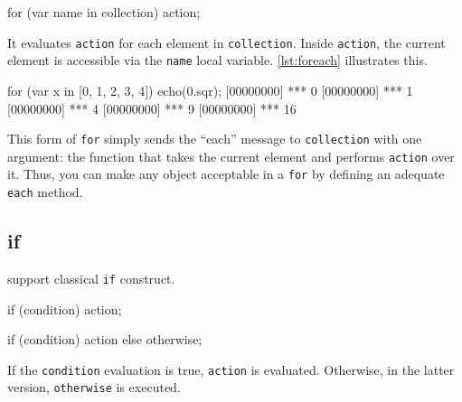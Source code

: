 \begin{urbiscript}[frame=, backgroundcolor=, ]
  for (var name in collection)
    action;
\end{urbiscript}

It evaluates \lstinline|action| for each element in
\lstinline|collection|. Inside \lstinline|action|, the current element
is accessible via the \lstinline|name| local variable. \autoref{lst:foreach}
illustrates this.


\begin{urbiscript}[caption=Iterating over a collection with for, label=lst:foreach,
  float=\floatpos]
  for (var x in [0, 1, 2, 3, 4])
    echo(0.sqr);
  [00000000] *** 0
  [00000000] *** 1
  [00000000] *** 4
  [00000000] *** 9
  [00000000] *** 16
\end{urbiscript}

This form of \lstinline|for| simply sends the ``each'' message to
\lstinline|collection| with one argument: the function that takes the
current element and performs \lstinline|action| over it. Thus, you can
make any object acceptable in a \lstinline|for| by defining an
adequate \lstinline|each| method.


\subsection{if}

\us support classical \lstinline|if| construct.

\begin{urbiscript}[frame=, backgroundcolor=, ]
  if (condition)
    action;

  if (condition)
    action
  else
    otherwise;
\end{urbiscript}

If the \lstinline|condition| evaluation is true, \lstinline|action| is
evaluated. Otherwise, in the latter version, \lstinline|otherwise| is
executed.

